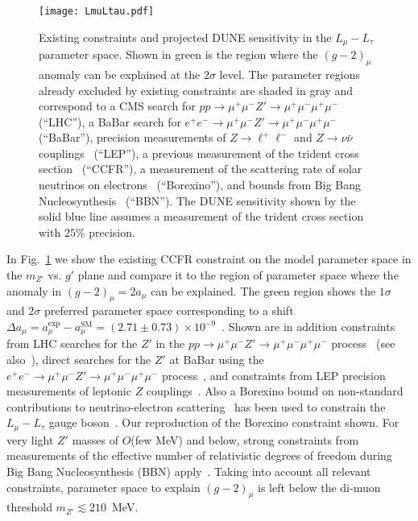 \begin{figure}[tb!] \centering
\texttt{[image: LmuLtau.pdf]}
\caption{Existing constraints and projected DUNE sensitivity in the $L_\mu - L_\tau$ parameter space. Shown in green is the region where the $(g-2)_\mu$ anomaly can be explained at the $2\sigma$ level. The parameter regions already excluded by existing constraints are shaded in gray and correspond to a CMS search for $pp \to \mu^+\mu^- Z' \to \mu^+\mu^-\mu^+\mu^-$~\cite{Sirunyan:2018nnz} (``LHC''), a BaBar search for $e^+e^- \to \mu^+\mu^- Z' \to \mu^+\mu^-\mu^+\mu^-$~\cite{TheBABAR:2016rlg} (``BaBar''), precision measurements of $Z \to \ell^+ \ell^-$ and $Z \to \nu\bar\nu$ couplings~\cite{ALEPH:2005ab,Altmannshofer:2014cfa} (``LEP''), a previous measurement of the trident cross section~\cite{Mishra:1991bv,Altmannshofer:2014pba} (``CCFR''), a measurement of the scattering rate of solar neutrinos on electrons~\cite{Bellini:2011rx,Harnik:2012ni,Agostini:2017ixy} (``Borexino''), and bounds from Big Bang Nucleosynthesis~\cite{Ahlgren:2013wba,Kamada:2015era} (``BBN''). The DUNE sensitivity shown by the solid blue line assumes a measurement of the trident cross section with $25\%$ precision.}
\label{fig:LmuLtau}
\end{figure}

In Fig.~\ref{fig:LmuLtau} we show the existing CCFR constraint on the model parameter space in the $m_{Z'}$ vs. $g'$ plane and compare it to the region of parameter space where the anomaly in $(g-2)_\mu = 2 a_\mu$ can be explained. The green region shows the $1\sigma$ and $2\sigma$ preferred parameter space corresponding to a shift $\Delta a_\mu = a_\mu^\text{exp}-a_\mu^\text{SM} = (2.71 \pm 0.73) \times 10^{-9}$~\cite{Keshavarzi:2018mgv}.
Shown are in addition constraints from LHC searches for the $Z'$ in the $pp \to \mu^+\mu^- Z' \to \mu^+\mu^-\mu^+\mu^-$ process~\cite{Sirunyan:2018nnz} (see also~\cite{Altmannshofer:2014pba}), direct searches for the $Z'$ at BaBar using the $e^+e^- \to \mu^+\mu^- Z' \to \mu^+\mu^-\mu^+\mu^-$ process~\cite{TheBABAR:2016rlg}, and constraints from LEP precision measurements of leptonic $Z$ couplings~\cite{ALEPH:2005ab,Altmannshofer:2014cfa}.  
Also a Borexino bound on non-standard contributions to neutrino-electron scattering~\cite{Harnik:2012ni,Bellini:2011rx,Agostini:2017ixy} has been used to constrain the $L_\mu - L_\tau$ gauge boson~\cite{Kamada:2015era,Araki:2015mya,Kamada:2018zxi}. Our reproduction of the Borexino constraint shown.
For very light $Z'$ masses of $O$(few MeV) and below, strong constraints from measurements of the effective number of relativistic degrees of freedom during Big Bang Nucleosynthesis (BBN) apply~\cite{Ahlgren:2013wba,Kamada:2015era}.
Taking into account all relevant constraints, parameter space to explain $(g-2)_\mu$ is left below the di-muon threshold $m_{Z'} \lesssim 210$~MeV.

